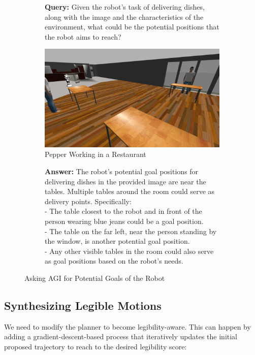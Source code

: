 \begin{figure}[ht]
  \centering
  \begin{subfigure}{0.8\textwidth}
    \textbf{Query:} Given the robot's task of delivering dishes, along with the image and the characteristics of the environment, what could be the potential positions that the robot aims to reach?
    \vspace{10pt}
  \end{subfigure}

  \begin{subfigure}{\textwidth}
  \centering
    \includegraphics[width=0.8\linewidth]{figs/pepper-in-restaurant.png}
    \caption{Pepper Working in a Restaurant}
  \end{subfigure}

  \begin{subfigure}{\textwidth}
    \vspace{10pt}
    \textbf{Answer:} 
        The robot's potential goal positions for delivering dishes in the provided image are near the tables. Multiple tables around the room could serve as delivery points. Specifically: \\
        - The table closest to the robot and in front of the person wearing blue jeans could be a goal position. \\
        - The table on the far left, near the person standing by the window, is another potential goal position. \\
        - Any other visible tables in the room could also serve as goal positions based on the robot's needs.
  \end{subfigure}

  \caption{Asking AGI for Potential Goals of the Robot}
  \label{fig:vqa_example}
\end{figure}


\subsection{Synthesizing Legible Motions}
We need to modify the planner to become legibility-aware. This can happen by adding a gradient-descent-based process that iteratively updates the initial proposed trajectory to reach to the desired legibility score:





